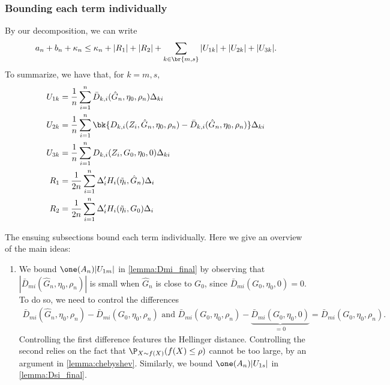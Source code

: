 \documentclass[12pt, reqno]{amsart}
\numberwithin{equation}{section}
\begin{document}
\begin{refsection}
\begin{appendices}
\subsubsection{Bounding each term individually}
\label{ss:proof_intuition_oracle_ineq}
By our decomposition, we can write \[
a_n + b_n + \kappa_n \le \kappa_n + |R_{1}| + |R_{2}| + \sum_{k \in \br{m,s}} |U_{1k}| +
|U_{2k}| +
|U_{3k}|.
\]
To summarize, we have that, for $k = m,s,$ \begin{align}
U_{1k} &= \frac{1}{n}\sum_{i=1}^n \bar D_{k,i}(\hat G_n, \eta_0, \rho_n) \Delta_{ki} \\ 
U_{2k} &= \frac{1}{n}\sum_{i=1}^n \bk{D_{k,i}(Z_i, \hat G_n, \eta_0, \rho_n) - \bar D_
{k,i}
(\hat
G_n, \eta_0, \rho_n)} \Delta_ {ki} \\
U_{3k} &= \frac{1}{n}\sum_{i=1}^n D_{k,i}(Z_i, G_0, \eta_0, 0) \Delta_{ki} \\
R_1 &= \frac{1}{2n}\sum_{i=1}^n \Delta_i'H_i(\tilde\eta_i, \hat G_n) \Delta_i \\ 
R_2 &= \frac{1}{2n}\sum_{i=1}^n \Delta_i'H_i(\tilde\eta_i, G_0) \Delta_i
\end{align}

The ensuing subsections bound each term individually. Here we give an overview of the
main ideas:
\begin{enumerate}[wide]
    \item We bound $\one(A_n) |U_{1m}|$ in \cref{lemma:Dmi_final} by observing that $|\bar
    D_{mi}(\hat G_n, \eta_0, \rho_n)|$ is small when $\hat G_n$ is close to $G_0$, since
    $\bar D_ {mi} (G_0, \eta_0,
    0) = 0$. To do so, we need to control the differences \begin{align*}
    \bar D_{mi}(\hat G_n, \eta_0, \rho_n) - \bar D_{mi}(G_0, \eta_0, \rho_n) \text{ and }
\bar D_{mi}(G_0, \eta_0, \rho_n) - \underbrace{ \bar D_{mi}(G_0, \eta_0, 0)}_{= 0} = \bar D_{mi}(G_0, \eta_0,
\rho_n).
    \end{align*}
    Controlling the first difference features the Hellinger distance. Controlling
    the second relies on the fact that $\P_{X \sim f(X)}(f(X) \le \rho)$ cannot be too
    large, by an argument in \cref{lemma:chebyshev}. Similarly, we bound $\one(A_n) |U_
    {1s}|$ in \cref{lemma:Dsi_final}.


\end{enumerate}
\end{appendices}
\end{refsection}
\end{document}
